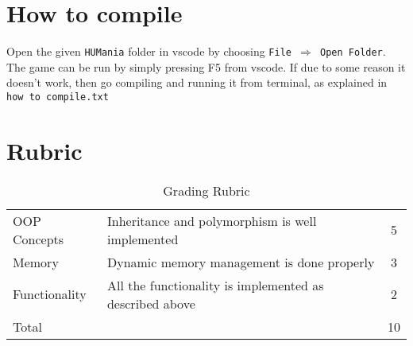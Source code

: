 \documentclass[a4paper,12pt]{article}
\begin{document}
\section{How to compile}
Open the given \texttt{HUMania} folder in vscode by choosing \texttt{File $\Rightarrow$ Open Folder}. The game can be run by simply pressing F5 from vscode. If due to some reason it doesn't work, then go compiling and running it from terminal, as explained in \texttt{how to compile.txt}


\section{Rubric}
\begin{table}[!h]
	\centering
	\begin{tabular}{llc}
		\toprule
		OOP Concepts & Inheritance and polymorphism is well implemented & 5 \\
		 Memory &	Dynamic memory management is done properly	& 3\\
		Functionality	& All the functionality is implemented as described above	& 2 \\
		\midrule
		Total & & 10\\
		\bottomrule
	\end{tabular}
	\caption{Grading Rubric}
	\label{Grading}
\end{table}


	
	
\end{document}
